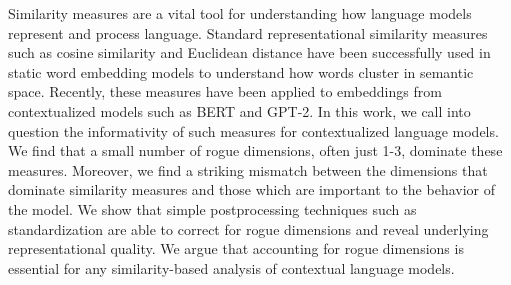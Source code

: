 Similarity measures are a vital tool for understanding how language models represent and process language. Standard representational similarity measures such as cosine similarity and Euclidean distance have been successfully used in static word embedding models to understand how words cluster in semantic space. Recently, these measures have been applied to embeddings from contextualized models such as BERT and GPT-2. In this work, we call into question the informativity of such measures for contextualized language models. We find that a small number of rogue dimensions, often just 1-3, dominate these measures. Moreover, we find a striking mismatch between the dimensions that dominate similarity measures and those which are important to the behavior of the model. We show that simple postprocessing techniques such as standardization are able to correct for rogue dimensions and reveal underlying representational quality. We argue that accounting for rogue dimensions is essential for any similarity-based analysis of contextual language models.
